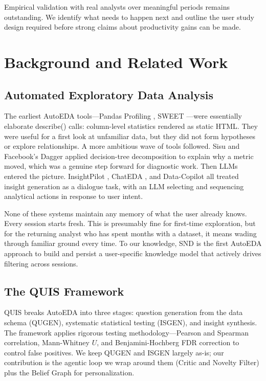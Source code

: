 \documentclass[conference]{IEEEtran}
\begin{document}
Empirical validation with real analysts over meaningful periods remains
outstanding. We identify what needs to happen next and outline the user
study design required before strong claims about productivity gains
can be made.

\section{Background and Related Work}
\label{sec:related}

\subsection{Automated Exploratory Data Analysis}

The earliest AutoEDA tools---Pandas Profiling \cite{pandas_profiling},
SWEET \cite{sweet2017}---were essentially elaborate describe() calls:
column-level statistics rendered as static HTML. They were useful for
a first look at unfamiliar data, but they did not form hypotheses or
explore relationships. A more ambitious wave of tools followed. Sisu
\cite{sisu} and Facebook's Dagger \cite{dagger2019} applied
decision-tree decomposition to explain why a metric moved, which was
a genuine step forward for diagnostic work. Then LLMs entered the
picture. InsightPilot \cite{wang2023insightpilot}, ChatEDA
\cite{chateda2024}, and Data-Copilot \cite{datacopilot2023} all
treated insight generation as a dialogue task, with an LLM selecting
and sequencing analytical actions in response to user intent.

None of these systems maintain any memory of what the user already
knows. Every session starts fresh. This is presumably fine for first-time
exploration, but for the returning analyst who has spent months with
a dataset, it means wading through familiar ground every time.
To our knowledge, SND is the first AutoEDA approach to build and
persist a user-specific knowledge model that actively drives filtering
across sessions.

\subsection{The QUIS Framework}

QUIS \cite{quis2024emnlp} breaks AutoEDA into three stages: question
generation from the data schema (QUGEN), systematic statistical testing
(ISGEN), and insight synthesis. The framework applies rigorous testing
methodology---Pearson and Spearman correlation, Mann-Whitney $U$, and
Benjamini-Hochberg FDR correction to control false positives. We keep
QUGEN and ISGEN largely as-is; our contribution is the agentic loop
we wrap around them (Critic and Novelty Filter) plus the Belief Graph
for personalization.
\end{document}
